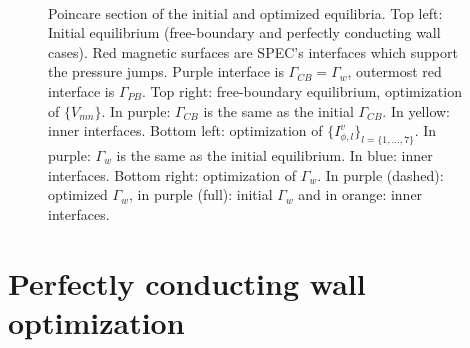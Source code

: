 \documentclass[my_thesis.tex]{subfiles}
\begin{document}
\begin{figure}
\centering
\hfill
{}
\hfill
{}
\hfill \\
\centering
\hfill
{}
\hfill
{}
\hfill
\caption{Poincare section of the initial and optimized equilibria. Top left: Initial equilibrium (free-boundary and perfectly conducting wall cases). Red magnetic surfaces are SPEC's interfaces which support the pressure jumps. Purple interface is $\Gamma_{CB}=\Gamma_w$, outermost red interface is $\Gamma_{PB}$. Top right: free-boundary equilibrium, optimization of $\{V_{mn}\}$. In purple: $\Gamma_{CB}$ is the same as the initial $\Gamma_{CB}$. In yellow:  inner interfaces. Bottom left: optimization of $\{I^v_{\phi,l}\}_{l=\{1,\ldots,7\}}$. In purple: $\Gamma_w$ is the same as the initial equilibrium. In blue: inner interfaces. Bottom right: optimization of $\Gamma_w$. In purple (dashed): optimized $\Gamma_w$, in purple (full): initial $\Gamma_w$ and in orange: inner interfaces.}
\label{fig:poincare_plots}
\end{figure}


\section{Perfectly conducting wall optimization}
\end{document}
